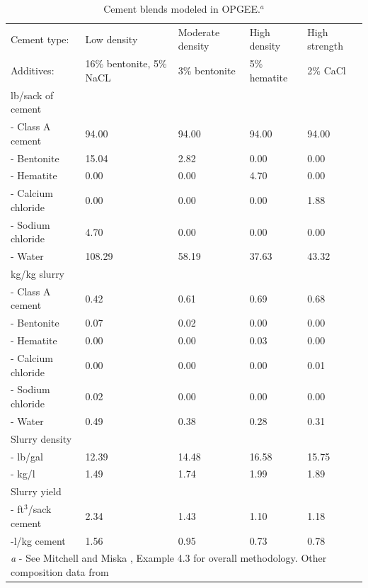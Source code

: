 \documentclass[11pt]{report}
\begin{document}
\begin{table}
\begin{scriptsize}
\caption{Cement blends modeled in OPGEE.$^a$}
\label{tab:cements}
\begin{tabular*}{1\columnwidth}{p{}p{}p{}p{}p{}}
\toprule
Cement type: & Low density & Moderate density & High density & High strength \\
Additives: & 16\% bentonite, 5\% NaCL & 3\% bentonite & 5\% hematite & 2\% CaCl \\
\midrule
lb/sack of cement & & & & \\ 
- Class A cement &94.00 &94.00 &94.00 &94.00 \\
- Bentonite &15.04 &2.82 &0.00 &0.00 \\
- Hematite &0.00 &0.00 &4.70 &0.00 \\
- Calcium chloride &0.00 &0.00 &0.00 &1.88 \\
- Sodium chloride &4.70 &0.00 &0.00 &0.00 \\ 
- Water &108.29 &58.19 &37.63 &43.32 \\
\midrule
kg/kg slurry & & & & \\ 
- Class A cement &0.42 &0.61 &0.69 &0.68 \\
- Bentonite &0.07 &0.02 &0.00 &0.00 \\
- Hematite &0.00 &0.00 &0.03 &0.00 \\
- Calcium chloride &0.00 &0.00 &0.00 &0.01 \\
- Sodium chloride &0.02 &0.00 &0.00 &0.00 \\
- Water &0.49 &0.38 &0.28 &0.31 \\
\midrule
Slurry density & & & & \\ 
- lb/gal &12.39 &14.48 &16.58 &15.75 \\
- kg/l &1.49 &1.74 &1.99 &1.89 \\
\midrule
Slurry yield & & & & \\ 
- ft$^3$/sack cement &2.34 &1.43 &1.10 &1.18\\
-l/kg cement &1.56 &0.95 &0.73 &0.78\\
\bottomrule 
\multicolumn{5}{p{1\columnwidth}}{\emph{a} - See Mitchell and Miska \cite[Example 4.3]{Mitchell2011}, Example 4.3 for overall methodology. Other composition data from \cite[Example 4.4, 4.5]{Mitchell2011}}\\
\end{tabular*}
\end{scriptsize}
\end{table}
\end{document}
